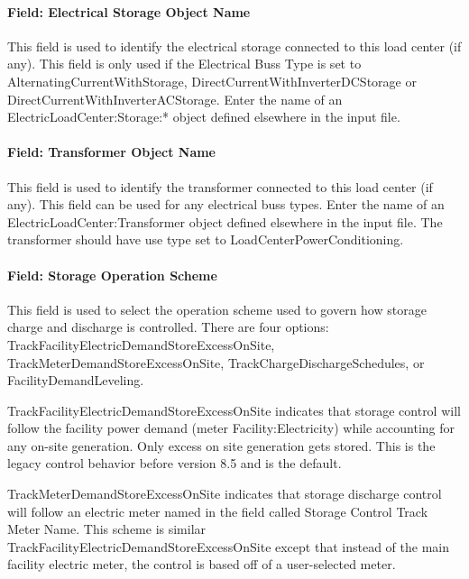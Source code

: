 \paragraph{Field: Electrical Storage Object Name}\label{field-electrical-storage-object-name}

This field is used to identify the electrical storage connected to this load center (if any). This field is only used if the Electrical Buss Type is set to AlternatingCurrentWithStorage, DirectCurrentWithInverterDCStorage or DirectCurrentWithInverterACStorage. Enter the name of an ElectricLoadCenter:Storage:* object defined elsewhere in the input file.

\paragraph{Field: Transformer Object Name}\label{field-transformer-object-name}

This field is used to identify the transformer connected to this load center (if any). This field can be used for any electrical buss types. Enter the name of an ElectricLoadCenter:Transformer object defined elsewhere in the input file. The transformer should have use type set to LoadCenterPowerConditioning.

\paragraph{Field: Storage Operation Scheme}\label{field-storage-operation-scheme}

This field is used to select the operation scheme used to govern how storage charge and discharge is controlled. There are four options: TrackFacilityElectricDemandStoreExcessOnSite, TrackMeterDemandStoreExcessOnSite, TrackChargeDischargeSchedules, or FacilityDemandLeveling.

TrackFacilityElectricDemandStoreExcessOnSite indicates that storage control will follow the facility power demand (meter Facility:Electricity) while accounting for any on-site generation. Only excess on site generation gets stored. This is the legacy control behavior before version 8.5 and is the default.

TrackMeterDemandStoreExcessOnSite indicates that storage discharge control will follow an electric meter named in the field called Storage Control Track Meter Name. This scheme is similar TrackFacilityElectricDemandStoreExcessOnSite except that instead of the main facility electric meter, the control is based off of a user-selected meter.

